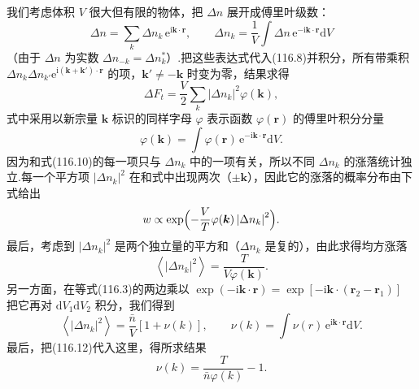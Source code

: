 我们考虑体积 $V$ 很大但有限的物体，把 $\Delta n$ 展开成傅里叶级数：
\begin{equation}
  \Delta n=\sum_{k}\Delta n_{k}\,\mathrm{e}^{\mathrm{i}\boldsymbol{k}\cdot\boldsymbol{r}},
  \qquad
  \Delta n_{k}=\frac{1}{V}\int\Delta n\,
  \mathrm{e}^{-\mathrm{i}\boldsymbol{k}\cdot\boldsymbol{r}}\mathrm{d}V
\end{equation}
（由于 $\Delta n$ 为实数 $\Delta n_{-k}=\Delta n^{*}_{k}$）.把这些表达式代入(116.8)并积分，所有带乘积
$\Delta n_{k}\Delta n_{k'}\mathrm{e}^{\mathrm{i}(\boldsymbol{k}+\boldsymbol{k}')\cdot\boldsymbol{r}}$
的项，$\boldsymbol{k}'\neq-\boldsymbol{k}$ 时变为零，结果求得
\begin{equation}
  \Delta F_{t}=\frac{V}{2}\sum_{k}|\Delta n_{k}|^{2}\varphi(\boldsymbol{k}),
\end{equation}
式中采用以新宗量 $\boldsymbol{k}$ 标识的同样字母 $\varphi$ 表示函数 $\varphi(\boldsymbol{r})$ 的傅里叶积分分量
\begin{equation}
  \varphi(\boldsymbol{k})=\int\varphi(\boldsymbol{r})\,
  \mathrm{e}^{-\mathrm{i}\boldsymbol{k}\cdot\boldsymbol{r}}\mathrm{d}V.
\end{equation}
因为和式(116.10)的每一项只与 $\Delta n_{k}$ 中的一项有关，所以不同 $\Delta n_{k}$ 的涨落统计独立.每一个平方项 $|\Delta n_{k}|^{2}$ 在和式中出现两次（$\pm\boldsymbol{k}$），因此它的涨落的概率分布由下式给出
\begin{equation*}
  w\propto\exp\Bigl(-\frac{V}{T}\varphi(\boldsymbol{k})
  \left|\Delta n_{k}\right|^{2}\Bigr).
\end{equation*}
最后，考虑到 $|\Delta n_{k}|^{2}$ 是两个独立量的平方和（$\Delta n_{k}$ 是复的），由此求得均方涨落
\begin{equation}
  \left\langle|\Delta n_{k}|^{2}\right\rangle=\frac{T}{V\varphi(\boldsymbol{k})}.
\end{equation}
另一方面，在等式(116.3)的两边乘以
$\exp(-\mathrm{i}\boldsymbol{k}\cdot\boldsymbol{r})
=\exp[-\mathrm{i}\boldsymbol{k}\cdot(\boldsymbol{r}_{2}-\boldsymbol{r}_{1})]$
把它再对 $\mathrm{d}V_{1}\mathrm{d}V_{2}$ 积分，我们得到
\begin{equation}
  \left\langle|\Delta n_{k}|^{2}\right\rangle
  =\frac{\bar{n}}{V}\left[1+\nu(k)\right],\qquad
  \nu(k)=\int\nu(r)\,\mathrm{e}^{\mathrm{i}\boldsymbol{k}\cdot\boldsymbol{r}}\mathrm{d}V.
\end{equation}
最后，把(116.12)代入这里，得所求结果
\begin{equation}
  \nu(k)=\frac{T}{\bar{n}\varphi(k)}-1.
\end{equation}

